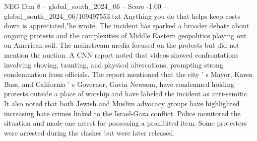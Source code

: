 \begin{textsample}{NEG Dim 8 – global\_south\_2024\_06 – Score -1.00 – global\_south\_2024\_06/109497553.txt}
Anything you do that helps keep costs down is appreciated,"he wrote.
The incident has sparked a broader debate about ongoing protests and the complexities of Middle Eastern geopolitics playing out on American soil.
The mainstream media focused on the protests but did not mention the auction.
A CNN report noted that videos showed confrontations involving shoving, taunting, and physical altercations, prompting strong condemnation from officials.
The report mentioned that the city ' s Mayor, Karen Bass, and California ' s Governor, Gavin Newsom, have condemned holding protests outside a place of worship and have labeled the incident as anti-semitic.
It also noted that both Jewish and Muslim advocacy groups have highlighted increasing hate crimes linked to the Israel-Gaza conflict.
Police monitored the situation and made one arrest for possessing a prohibited item.
Some protesters were arrested during the clashes but were later released.

\end{textsample}
